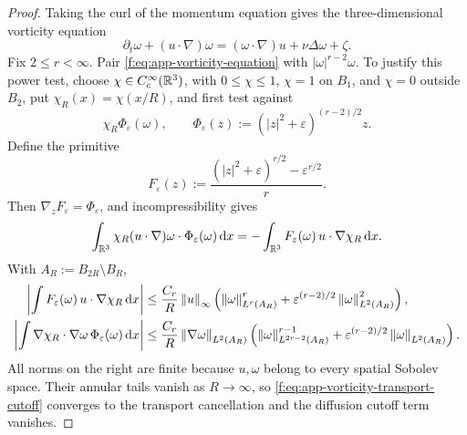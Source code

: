 \begin{proof}
Taking the curl of the momentum equation gives the three-dimensional
vorticity equation
\begin{equation}
 \partial_t\omega+(u\cdot\nabla)\omega
 = (\omega\cdot\nabla)u+\nu\Delta\omega+\zeta.
 \label{f:eq:app-vorticity-equation}
\end{equation}
Fix \(2\le r<\infty\).  Pair
\eqref{f:eq:app-vorticity-equation} with
\(|\omega|^{r-2}\omega\).  To justify this power test, choose
\(\chi\in C_c^\infty(\mathbb R^3)\), with
\(0\le\chi\le1\), \(\chi=1\) on \(B_1\), and \(\chi=0\) outside
\(B_2\), put \(\chi_R(x)=\chi(x/R)\), and first test against
\[
 \chi_R\Phi_\varepsilon(\omega),
 \qquad
 \Phi_\varepsilon(z):=(|z|^2+\varepsilon)^{(r-2)/2}z.
\]
Define the primitive
\begin{equation}
 F_\varepsilon(z)
 :=\frac{(|z|^2+\varepsilon)^{r/2}-\varepsilon^{r/2}}{r}.
 \label{f:eq:app-vorticity-regularized-primitive}
\end{equation}
Then \(\nabla_zF_\varepsilon=\Phi_\varepsilon\), and incompressibility gives
\begin{equation}
 \int_{\mathbb R^3}\chi_R(u\cdot\nabla)\omega\cdot
 \Phi_\varepsilon(\omega)\,\mathrm d x
 =-\int_{\mathbb R^3}F_\varepsilon(\omega)\,
 u\cdot\nabla\chi_R\,\mathrm d x.
 \label{f:eq:app-vorticity-transport-cutoff}
\end{equation}
With \(A_R:=B_{2R}\setminus B_R\),
\begin{align}
 \left|\int F_\varepsilon(\omega)\,
 u\cdot\nabla\chi_R\,\mathrm d x\right|
 &\le\frac{C_r}{R}\left\lVert u\right\rVert_\infty
 \left(\left\lVert \omega\right\rVert_{L^r(A_R)}^r
 +\varepsilon^{(r-2)/2}\left\lVert \omega\right\rVert_{L^2(A_R)}^2\right),
 \label{f:eq:app-vorticity-transport-cutoff-bound}\\
 \left|\int \nabla\chi_R\cdot\nabla\omega\,
 \Phi_\varepsilon(\omega)\,\mathrm d x\right|
 &\le\frac{C_r}{R}\left\lVert \nabla\omega\right\rVert_{L^2(A_R)}
 \left(\left\lVert \omega\right\rVert_{L^{2r-2}(A_R)}^{r-1}
 +\varepsilon^{(r-2)/2}\left\lVert \omega\right\rVert_{L^2(A_R)}\right).
 \label{f:eq:app-vorticity-diffusion-cutoff-bound}
\end{align}
All norms on the right are finite because \(u,\omega\) belong to every
spatial Sobolev space.  Their annular tails vanish as \(R\to\infty\), so
\eqref{f:eq:app-vorticity-transport-cutoff} converges to the transport
cancellation and the diffusion cutoff term vanishes.


\end{proof}
